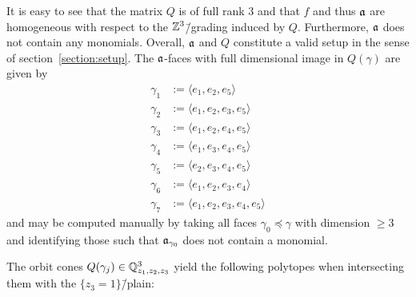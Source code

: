 It is easy to see that the matrix $Q$ is of full rank 3 and that $f$ and thus $\mathfrak{a}$ are homogeneous with respect to the $\mathbb{Z}^3$\=/grading induced by $Q$. Furthermore, $\mathfrak{a}$ does not contain any monomials. Overall, $\mathfrak{a}$ and $Q$ constitute a valid setup in the sense of section~\ref{section:setup}. The $\mathfrak{a}$-faces with full dimensional image in $Q(\gamma)$ are given by
\begin{align*}
\gamma_1 &:=\langle e_1, e_2, e_5\rangle \\
\gamma_2 &:=\langle e_1, e_2, e_3, e_5\rangle \\
\gamma_3 &:=\langle e_1, e_2, e_4, e_5\rangle \\
\gamma_4 &:=\langle e_1, e_3, e_4, e_5\rangle \\
\gamma_5 &:=\langle e_2, e_3, e_4, e_5\rangle \\
\gamma_6 &:=\langle e_1, e_2, e_3, e_4\rangle \\
\gamma_7 &:=\langle e_1, e_2, e_3, e_4, e_5\rangle
\end{align*}
and may be computed manually by taking all faces $\gamma_0\preceq \gamma$ with dimension $\geq 3$ and identifying those such that $\mathfrak{a}_{\gamma_0}$ does not contain a monomial.

The orbit cones $Q(\gamma_j)\in \mathbb{Q}^3_{z_1,z_2,z_3}$ yield the following polytopes when intersecting them with the $\{z_3 = 1\}$\=/plain:

